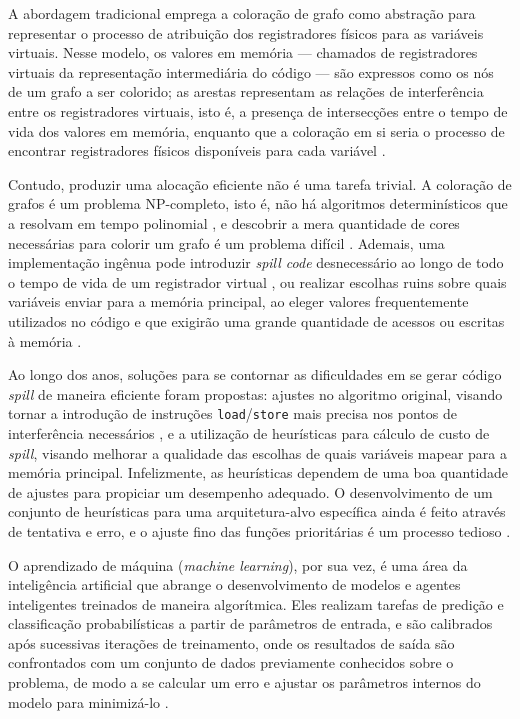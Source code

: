 \documentclass[
	12pt,				%
	openright,			%
	oneside,			%
	a4paper,			%
	tccpreliminar,			%
	]{ABNT-DC-UEL}
\begin{document}
A abordagem tradicional emprega a coloração de grafo como abstração para representar o processo de atribuição dos registradores físicos para as variáveis virtuais. Nesse modelo, os valores em memória --- chamados de registradores virtuais da representação intermediária do código --- são expressos como os nós de um grafo a ser colorido; as arestas representam as relações de interferência entre os registradores virtuais, isto é, a presença de intersecções entre o tempo de vida dos valores em memória, enquanto que a coloração em si seria o processo de encontrar registradores físicos disponíveis para cada variável \cite{chaitin:81}.

Contudo, produzir uma alocação eficiente não é uma tarefa trivial. A coloração de grafos é um problema NP-completo, isto é, não há algoritmos determinísticos que a resolvam em tempo polinomial \cite{karp:72}, e descobrir a mera quantidade de cores necessárias para colorir um grafo é um problema difícil \cite{garey:76}. Ademais, uma implementação ingênua pode introduzir \textit{spill code} desnecessário ao longo de todo o tempo de vida de um registrador virtual \cite{bergner:97}, ou realizar escolhas ruins sobre quais variáveis enviar para a memória principal, ao eleger valores frequentemente utilizados no código e que exigirão uma grande quantidade de acessos ou escritas à memória \cite{bernstein:89}.

Ao longo dos anos, soluções para se contornar as dificuldades em se gerar código \textit{spill} de maneira eficiente foram propostas: ajustes no algoritmo original, visando tornar a introdução de instruções \texttt{load}/\texttt{store} mais precisa nos pontos de interferência necessários \cite{chaitin:82, briggs:92, briggs2:92, cooper:98}, e a utilização de heurísticas para cálculo de custo de \textit{spill}, visando melhorar a qualidade das escolhas de quais variáveis mapear para a memória principal. Infelizmente, as heurísticas dependem de uma boa quantidade de ajustes para propiciar um desempenho adequado. O desenvolvimento de um conjunto de heurísticas para uma arquitetura-alvo específica ainda é feito através de tentativa e erro, e o ajuste fino das funções prioritárias é um processo tedioso \cite{amarasinghe:03}.

O aprendizado de máquina (\textit{machine learning}), por sua vez, é uma área da inteligência artificial que abrange o desenvolvimento de modelos e agentes inteligentes treinados de maneira algorítmica. Eles realizam tarefas de predição e classificação probabilísticas a partir de parâmetros de entrada, e são calibrados após sucessivas iterações de treinamento, onde os resultados de saída são confrontados com um conjunto de dados previamente conhecidos sobre o problema, de modo a se calcular um erro e ajustar os parâmetros internos do modelo para minimizá-lo \cite{sharma:21}.
\end{document}
